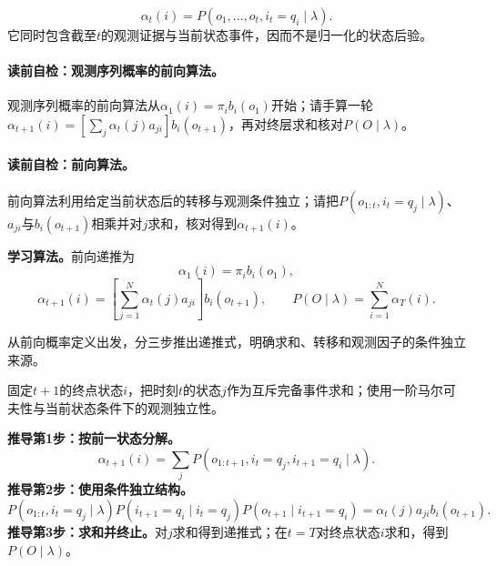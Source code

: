 \begin{definition}[前向概率]\label{def:V3-C05-forward}
\[
\alpha_t(i)=P(o_1,\ldots,o_t,i_t=q_i\mid\lambda).
\]
它同时包含截至$t$的观测证据与当前状态事件，因而不是归一化的状态后验。
\end{definition}

\paragraph{读前自检：观测序列概率的前向算法。}观测序列概率的前向算法从$\alpha_1(i)=\pi_i b_i(o_1)$开始；请手算一轮$\alpha_{t+1}(i)=[\sum_j\alpha_t(j)a_{ji}]b_i(o_{t+1})$，再对终层求和核对$P(O\mid\lambda)$。\par
\paragraph{读前自检：前向算法。}前向算法利用给定当前状态后的转移与观测条件独立；请把$P(o_{1:t},i_t=q_j\mid\lambda)$、$a_{ji}$与$b_i(o_{t+1})$相乘并对$j$求和，核对得到$\alpha_{t+1}(i)$。\par

\label{struct:V3-C05-CH10}
\textbf{学习算法。}前向递推为
\[
\alpha_1(i)=\pi_i b_i(o_1),
\]
\[
\alpha_{t+1}(i)=\left[\sum_{j=1}^{N}\alpha_t(j)a_{ji}\right]b_i(o_{t+1}),
\qquad
P(O\mid\lambda)=\sum_{i=1}^{N}\alpha_T(i).
\]

\label{struct:V3-C05-CH11}

\begin{derivationgoalbox}
从前向概率定义出发，分三步推出递推式，明确求和、转移和观测因子的条件独立来源。
\end{derivationgoalbox}
\begin{derivationprepbox}
固定$t+1$的终点状态$i$，把时刻$t$的状态$j$作为互斥完备事件求和；使用一阶马尔可夫性与当前状态条件下的观测独立性。
\end{derivationprepbox}
\textbf{推导第1步：按前一状态分解。}
\[
\alpha_{t+1}(i)=\sum_jP(o_{1:t+1},i_t=q_j,i_{t+1}=q_i\mid\lambda).
\]
\textbf{推导第2步：使用条件独立结构。}
\[
P(o_{1:t},i_t=q_j\mid\lambda)P(i_{t+1}=q_i\mid i_t=q_j)
P(o_{t+1}\mid i_{t+1}=q_i)
=\alpha_t(j)a_{ji}b_i(o_{t+1}).
\]
\textbf{推导第3步：求和并终止。}对$j$求和得到递推式；在$t=T$对终点状态$i$求和，得到$P(O\mid\lambda)$。


